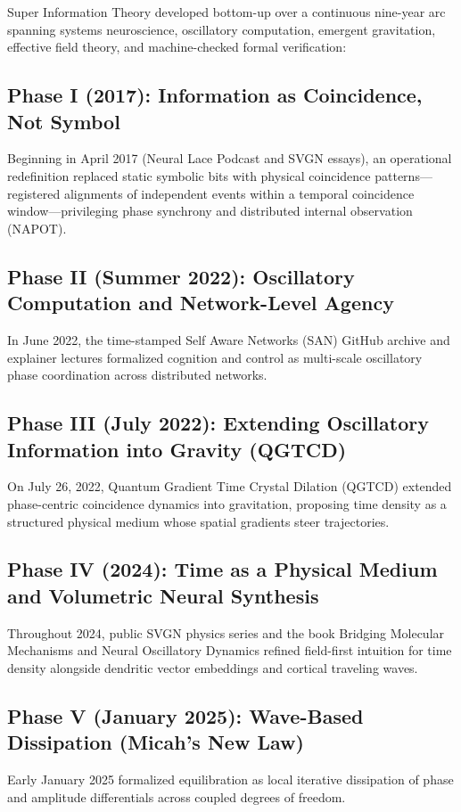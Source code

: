 \documentclass[american,11pt,letterpaper]{article}
\def\emph#1{#1}%
\begin{document}
Super Information Theory developed bottom-up over a continuous nine-year arc spanning systems neuroscience, oscillatory computation, emergent gravitation, effective field theory, and machine-checked formal verification:

\subsection{Phase I (2017): Information as Coincidence, Not Symbol}
Beginning in April 2017 (\emph{Neural Lace Podcast} and SVGN essays), an operational redefinition replaced static symbolic bits with physical \emph{coincidence patterns}---registered alignments of independent events within a temporal coincidence window---privileging phase synchrony and distributed internal observation (\emph{NAPOT}).

\subsection{Phase II (Summer 2022): Oscillatory Computation and Network-Level Agency}
In June 2022, the time-stamped \emph{Self Aware Networks} (SAN) GitHub archive and explainer lectures formalized cognition and control as multi-scale oscillatory phase coordination across distributed networks.

\subsection{Phase III (July 2022): Extending Oscillatory Information into Gravity (QGTCD)}
On July 26, 2022, \emph{Quantum Gradient Time Crystal Dilation} (QGTCD) extended phase-centric coincidence dynamics into gravitation, proposing time density as a structured physical medium whose spatial gradients steer trajectories.

\subsection{Phase IV (2024): Time as a Physical Medium and Volumetric Neural Synthesis}
Throughout 2024, public SVGN physics series and the book \emph{Bridging Molecular Mechanisms and Neural Oscillatory Dynamics} refined field-first intuition for time density alongside dendritic vector embeddings and cortical traveling waves.

\subsection{Phase V (January 2025): Wave-Based Dissipation (\emph{Micah's New Law})}
Early January 2025 formalized equilibration as local iterative dissipation of phase and amplitude differentials across coupled degrees of freedom.
\end{document}
